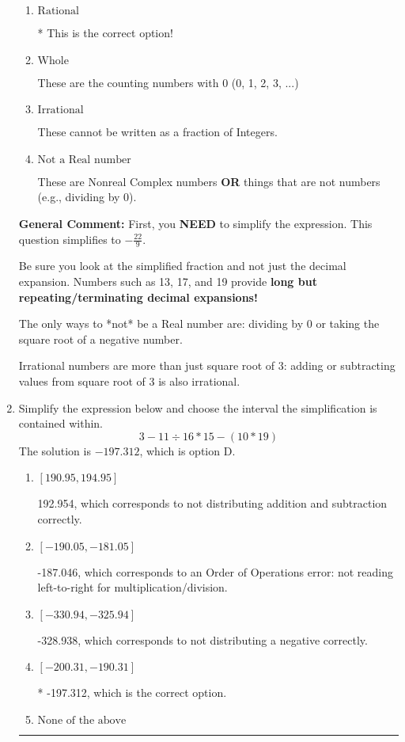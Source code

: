 \documentclass{extbook}[14pt]
\newcommand{\litem}[1]{\item #1

\rule{\textwidth}{0.4pt}}
\begin{document}
\begin{enumerate}
{\begin{enumerate}[label=\Alph*.]
These are the negative and positive counting numbers (..., -3, -2, -1, 0, 1, 2, 3, ...)
\item \( \text{Rational} \)

* This is the correct option!
\item \( \text{Whole} \)

These are the counting numbers with 0 (0, 1, 2, 3, ...)
\item \( \text{Irrational} \)

These cannot be written as a fraction of Integers.
\item \( \text{Not a Real number} \)

These are Nonreal Complex numbers \textbf{OR} things that are not numbers (e.g., dividing by 0).
\end{enumerate}

\textbf{General Comment:} First, you \textbf{NEED} to simplify the expression. This question simplifies to $-\frac{22}{9}$. 
 
 Be sure you look at the simplified fraction and not just the decimal expansion. Numbers such as 13, 17, and 19 provide \textbf{long but repeating/terminating decimal expansions!} 
 
 The only ways to *not* be a Real number are: dividing by 0 or taking the square root of a negative number. 
 
 Irrational numbers are more than just square root of 3: adding or subtracting values from square root of 3 is also irrational.
}
\litem{
Simplify the expression below and choose the interval the simplification is contained within.
\[ 3 - 11 \div 16 * 15 - (10 * 19) \]
The solution is \( -197.312 \), which is option D.\begin{enumerate}[label=\Alph*.]
\item \( [190.95, 194.95] \)

 192.954, which corresponds to not distributing addition and subtraction correctly.
\item \( [-190.05, -181.05] \)

 -187.046, which corresponds to an Order of Operations error: not reading left-to-right for multiplication/division.
\item \( [-330.94, -325.94] \)

 -328.938, which corresponds to not distributing a negative correctly.
\item \( [-200.31, -190.31] \)

* -197.312, which is the correct option.
\item \( \text{None of the above} \)


\end{enumerate}}
\end{enumerate}
\end{document}
